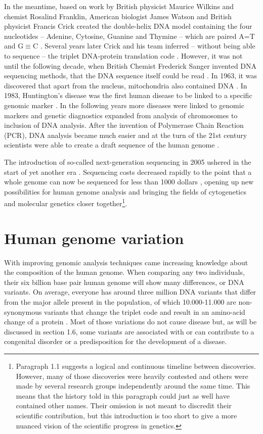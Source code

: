 In the meantime, based on work by British physicist Maurice Wilkins and chemist Rosalind Franklin, American biologist James Watson and British physicist Francis Crick created the double-helix DNA model containing the four nucleotides – Adenine, Cytosine, Guanine and Thymine – which are paired A=T and G$\equiv$C \cite{Watson_1953,Wilkins_1953,Franklin_1953}. 
Several years later Crick and his team inferred – without being able to sequence – the triplet DNA-protein translation code \cite{Crick_1961,Yanofsky_2007}. 
However, it was not until the following decade, when British Chemist Frederick Sanger invented DNA sequencing methods, that the DNA sequence itself could be read \cite{Sanger_1975,Sanger_1977}. 
In 1963, it was discovered that apart from the nucleus, mitochondria also contained DNA \cite{Nass_1963}. 
In 1983, Huntington’s disease was the first human disease to be linked to a specific genomic marker \cite{Gusella_1983}. 
In the following years more diseases were linked to genomic markers and genetic diagnostics expanded from analysis of chromosomes to inclusion of DNA analysis. 
After the invention of Polymerase Chain Reaction (PCR), DNA analysis became much easier \cite{Saiki_1985,Saiki_1988} and at the turn of the 21st century scientists were able to create a draft sequence of the human genome \cite{Lander_2001,Venter_2001}. 

The introduction of so-called next-generation sequencing in 2005 ushered in the start of yet another era \cite{Mardis_2013}. 
Sequencing costs decreased rapidly to the point that a whole genome can now be sequenced for less than 1000 dollars \cite{Goodwin_2016}, opening up new possibilities for human genome analysis and bringing the fields of cytogenetics and molecular genetics closer together\footnote{Paragraph 1.1 suggests a logical and continuous timeline between discoveries. However, many of those discoveries were heavily contested and others were made by several research groups independently around the same time. This means that the history told in this paragraph could just as well have contained other names. Their omission is not meant to discredit their scientific contribution, but this introduction is too short to give a more nuanced vision of the scientific progress in genetics.}. 



\section{Human genome variation} \label{intro_variation}
With improving genomic analysis techniques came increasing knowledge about the composition of the human genome. 
When comparing any two individuals, their six billion base pair human genome will show many differences, or DNA variants. On average, everyone has around three million DNA variants that differ from the major allele present in the population, of which 10.000-11.000 are non-synonymous variants that change the triplet code and result in an amino-acid change of a protein \cite{Abecasis_2010}. 
Most of those variations do not cause disease but, as will be discussed in section 1.6, some variants are associated with or can contribute to a congenital disorder or a predisposition for the development of a disease. 

